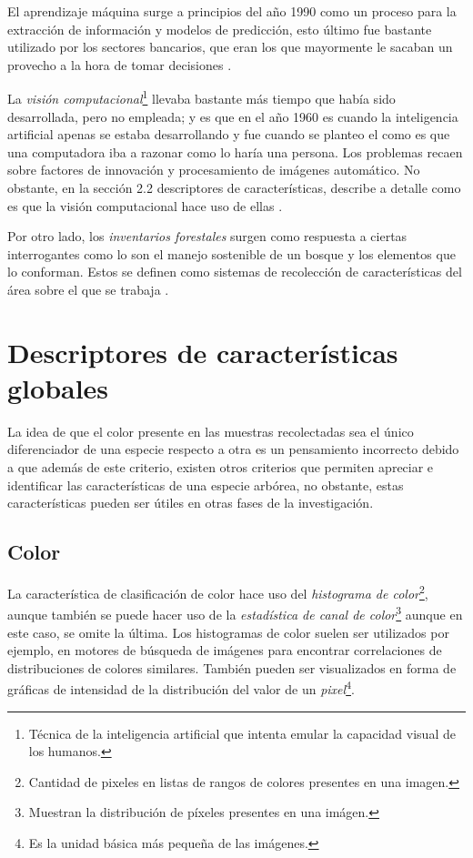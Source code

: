 El aprendizaje máquina surge a principios del año 1990 como un proceso para la extracción de información y modelos de predicción, esto último fue bastante utilizado por los sectores bancarios, que eran los que mayormente le sacaban un provecho a la hora de tomar decisiones \citep{rf5}. 

La \emph{visión computacional}\footnote{Técnica de la inteligencia artificial que intenta emular la capacidad visual de los humanos.} llevaba bastante más tiempo que había sido desarrollada, pero no empleada; y es que en el año 1960 es cuando la inteligencia artificial apenas se estaba desarrollando y fue cuando se planteo el como es que una computadora iba a razonar como lo haría una persona. Los problemas recaen sobre factores de innovación y procesamiento de imágenes automático. No obstante, en la sección 2.2 descriptores de características, describe a detalle como es que la visión computacional hace uso de ellas \citep{rf6}.

Por otro lado, los \emph{inventarios forestales} surgen como respuesta a ciertas interrogantes como lo son el manejo sostenible de un bosque y los elementos que lo conforman. Estos se definen como sistemas de recolección de características del área sobre el que se trabaja \citep{rf7}.

\section{Descriptores de características globales}
La idea de que el color presente en las muestras recolectadas sea el único diferenciador de una especie respecto a otra es un pensamiento incorrecto debido a que además de este criterio, existen otros criterios que permiten apreciar e identificar las características de una especie arbórea, no obstante, estas características pueden ser útiles en otras fases de la investigación. 

\subsection{Color}
La característica de clasificación de color hace uso del \emph{histograma de color}\footnote{Cantidad de pixeles en listas de rangos de colores presentes en una imagen.}, aunque también se puede hacer uso de la \emph{estadística de canal de color}\footnote{Muestran la distribución de píxeles presentes en una imágen.} aunque en este caso, se omite la última. Los histogramas de color suelen ser utilizados por ejemplo, en motores de búsqueda de imágenes para encontrar correlaciones de distribuciones de colores similares. También pueden ser visualizados en forma de gráficas de intensidad de la distribución del valor de un \emph{pixel}\footnote{Es la unidad básica más pequeña de las imágenes.}.

